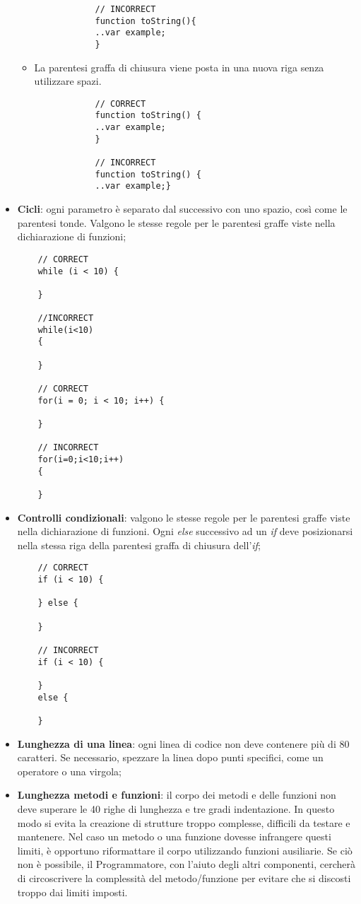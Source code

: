 \begin{itemize}
\begin{itemize}
\begin{lstlisting}
			// INCORRECT
			function toString(){    
			..var example;
			}
			\end{lstlisting}
			\item{La parentesi graffa di chiusura viene posta in una nuova riga senza utilizzare spazi.}
			\begin{lstlisting}
			// CORRECT
			function toString() {  
			..var example;
			}
			
			// INCORRECT
			function toString() {    
			..var example;}
			\end{lstlisting}
		\end{itemize}
	
	\item{\textbf{Cicli}: ogni parametro è separato dal successivo con uno spazio, così come le parentesi tonde. Valgono le stesse regole per le parentesi graffe viste nella dichiarazione di funzioni;
	\begin{lstlisting}
	// CORRECT
	while (i < 10) {  
	
	}
	
	//INCORRECT
	while(i<10)  
	{  
	
	}
	
	// CORRECT
	for(i = 0; i < 10; i++) {  
		
	}
	
	// INCORRECT
	for(i=0;i<10;i++)  
	{  
	
	}
	\end{lstlisting}	
	}

	\item{\textbf{Controlli condizionali}: valgono le stesse regole per le parentesi graffe viste nella dichiarazione di funzioni. Ogni \emph{else} successivo ad un \emph{if} deve posizionarsi nella stessa riga della parentesi graffa di chiusura dell'\emph{if};}
	\begin{lstlisting}
	// CORRECT
	if (i < 10) {  
	
	} else {
	
	}
	
	// INCORRECT
	if (i < 10) {    
	
	} 
	else {
	
	}
	\end{lstlisting}	
	
	\item{\textbf{Lunghezza di una linea}: ogni linea di codice non deve contenere più di 80 caratteri. Se necessario, spezzare la linea dopo punti specifici, come un operatore o una virgola;}
	
	\item{\textbf{Lunghezza metodi e funzioni}: il corpo dei metodi e delle funzioni non deve superare le 40 righe di lunghezza e tre gradi indentazione. In questo modo si evita la creazione di strutture troppo complesse, difficili da testare e mantenere. Nel caso un metodo o una funzione dovesse infrangere questi limiti, è opportuno riformattare il corpo utilizzando funzioni ausiliarie. Se ciò non è possibile, il Programmatore, con l'aiuto degli altri componenti, cercherà di circoscrivere la complessità del metodo/funzione per evitare che si discosti troppo dai limiti imposti.}
	
	
\end{itemize}


